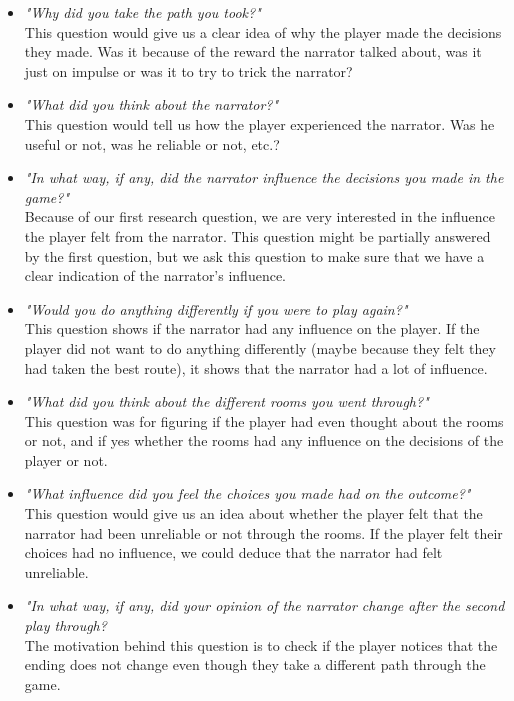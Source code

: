 \begin{itemize}

	\item \textit{"Why did you take the path you took?"} \\
 		This question would give us a clear idea of why the player made the decisions they made. Was it because of the reward the narrator talked about, was it just on impulse or was it to try to trick the narrator? \\

	\item \textit{"What did you think about the narrator?"} \\
		 This question would tell us how the player experienced the narrator. Was he useful or not, was he reliable or not, etc.? \\

	\item \textit{"In what way, if any, did the narrator influence the decisions you made in the game?"} \\
		 Because of our first research question, we are very interested in the influence the player felt from the narrator. This question might be partially answered by the first question, but we ask this question to make sure that we have a clear indication of the narrator's influence. \\

	\item \textit{"Would you do anything differently if you were to play again?"} \\
		 This question shows if the narrator had any influence on the player. If the player did not want to do anything differently (maybe because they felt they had taken the best route), it shows that the narrator had a lot of influence. \\

	\item \textit{"What did you think about the different rooms you went through?"} \\
		 This question was for figuring if the player had even thought about the rooms or not, and if yes whether the rooms had any influence on the decisions of the player or not. \\

	\item \textit{"What influence did you feel the choices you made had on the outcome?"} \\
		 This question would give us an idea about whether the player felt that the narrator had been unreliable or not through the rooms. If the player felt their choices had no influence, we could deduce that the narrator had felt unreliable. \\

	\item \textit{"In what way, if any, did your opinion of the narrator change after the second play through?} \\
		  The motivation behind this question is to check if the player notices that the ending does not change even though they take a different path through the game.
\end{itemize}

